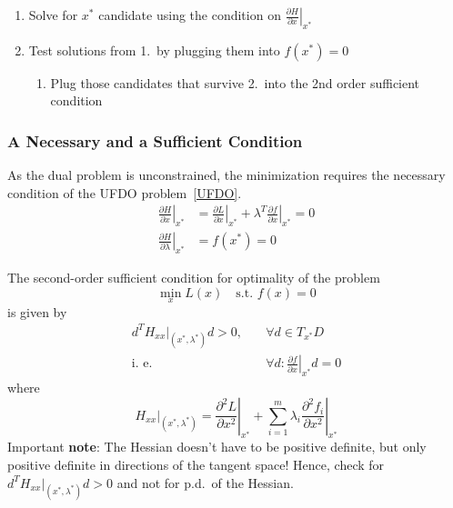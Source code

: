 \begin{enumerate}
    \item Solve for $x^*$ candidate using the condition on $\left.\frac{\partial H}{\partial x}\right|_{x^*}$
    \item Test solutions from 1.\ by plugging them into $f(x^*)=0$
          \begin{enumerate}
              \item Plug those candidates that survive 2.\ into the 2nd order sufficient condition
          \end{enumerate}
\end{enumerate}

\subsubsection{A Necessary and a Sufficient Condition}

As the dual problem is unconstrained, the minimization requires the necessary condition of the UFDO problem~\ref{UFDO}.
\begin{align*}
    \left.\frac{\partial H}{\partial x}\right|_{x^*}       & = \left.\frac{\partial L}{\partial x}\right|_{x^*} + \lambda^T \left.\frac{\partial f}{\partial x}\right|_{x^*} = 0 \\
    \left.\frac{\partial H}{\partial \lambda}\right|_{x^*} & = f(x^*) = 0
\end{align*}

\newpar{}

The second-order sufficient condition for optimality of the problem
\begin{equation*}
    \min_x L(x) \quad \text{s.t. } f(x) = 0
\end{equation*}
is given by
\begin{align*}
    d^T H_{xx}|_{(x^*, \lambda^*)} d > 0, & \quad \forall d \in T_{x^*}D                                             \\
    \text{i.\ e.\ }                       & \quad \forall d : \left.\frac{\partial f}{\partial x}\right|_{x^*} d = 0
\end{align*}
where
\begin{equation*}
    H_{xx}|_{(x^*, \lambda^*)} = \left.\frac{\partial^2 L}{\partial x^2}\right|_{x^*} + \sum_{i=1}^m \lambda_i \left.\frac{\partial^2 f_i}{\partial x^2}\right|_{x^*}
\end{equation*}
Important \textbf{note}: The Hessian doesn't have to be positive definite, but only positive definite in directions of the tangent space! Hence, check for $d^T H_{xx}|_{(x^*, \lambda^*)} d > 0$ and not for p.d.\ of the Hessian.

